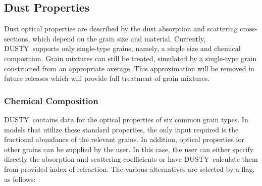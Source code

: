 \documentclass[11pt]{article}
\def\D  {{\sf DUSTY}}
\begin{document}
\subsection{Dust Properties}

Dust optical properties are described by the dust absorption and scattering
cross-sections, which depend on the grain size and  material. Currently, \D\
supports only single-type grains, namely, a single size and chemical
composition.  Grain mixtures can still be treated, simulated by a single-type
grain constructed from an appropriate average.  This approximation will be
removed in future releases which will provide full treatment of grain mixtures.

\subsubsection{Chemical Composition}
\label{chemistry}

\D\ contains data for the optical properties of six common grain types.  In
models that utilize these standard properties, the only input required is the
fractional abundance of the relevant grains.  In addition, optical properties
for other grains can be supplied by the user.  In this case, the user can either
specify directly the absorption and scattering coefficients or have \D\
calculate them from provided index of refraction. The various alternatives are
selected by a flag, as follows:
\end{document}
